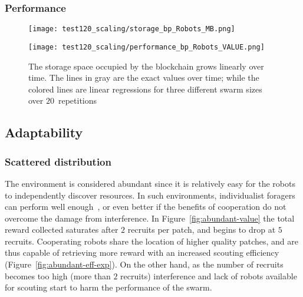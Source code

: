 \documentclass[runningheads]{llncs}
\begin{document}
\subsubsection{Performance}



\begin{figure}
\centering
\begin{minipage}{.495\textwidth}
  \centering
  \texttt{[image: test120\_scaling/storage\_bp\_Robots\_MB.png]}
  \label{fig:data-storage}
\end{minipage}
\centering
\begin{minipage}{.495\textwidth}
  \centering
  \texttt{[image: test120\_scaling/performance\_bp\_Robots\_VALUE.png]}
  \label{fig:performance}
\end{minipage}
\caption{The storage space occupied by the blockchain grows linearly over time. The lines in gray are the exact values over time; while the colored lines are linear regressions for three different swarm sizes over $20$~repetitions} 
\end{figure}


\subsection{Adaptability}
\label{subsec:adaptability}

\subsubsection{Scattered distribution}

The environment is considered abundant since it is relatively easy for the robots to independently discover resources. In such environments, individualist foragers can perform well enough~\cite{pitonakova_icr_2018,wilson_sociobiology_2000}, or even better if the benefits of cooperation do not overcome the damage from interference. In Figure~\ref{fig:abundant-value} the total reward collected saturates after $2$ recruits per patch, and begins to drop at $5$ recruits. Cooperating robots share the location of higher quality patches, and are thus capable of retrieving more reward with an increased scouting efficiency (Figure~\ref{fig:abundant-eff-exp}). On the other hand, as the number of recruits becomes too high (more than $2$ recruits) interference and lack of robots available for scouting start to harm the performance of the swarm.
\end{document}

